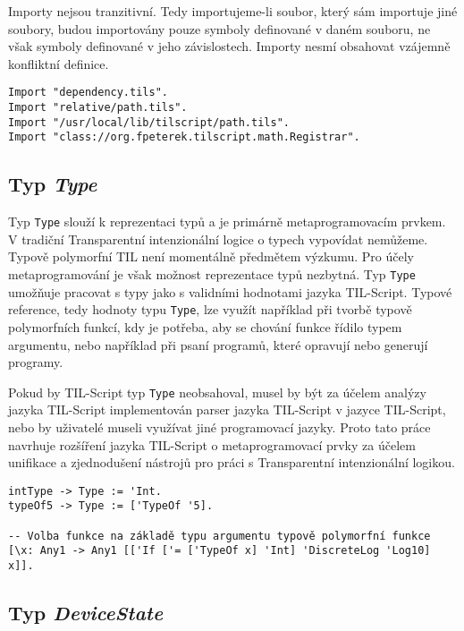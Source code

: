 Importy nejsou tranzitivní. Tedy importujeme-li soubor, který sám importuje jiné soubory, budou
importovány pouze symboly definované v daném souboru, ne však symboly definované v jeho
závislostech. Importy nesmí obsahovat vzájemně konfliktní definice.

\begin{lstlisting}[caption={Příklad využití výrazů Import}]
Import "dependency.tils".
Import "relative/path.tils".
Import "/usr/local/lib/tilscript/path.tils".
Import "class://org.fpeterek.tilscript.math.Registrar".
\end{lstlisting}

\subsection{Typ \textit{Type}}

Typ \lstinline{Type} slouží k reprezentaci typů a je primárně metaprogramovacím prvkem. V tradiční
Transparentní intenzionální logice o typech vypovídat nemůžeme. Typově polymorfní TIL není
momentálně předmětem výzkumu. Pro účely metaprogramování je však možnost reprezentace typů
nezbytná. Typ \lstinline{Type} umožňuje pracovat s typy jako s validními hodnotami jazyka
TIL-Script. Typové reference, tedy hodnoty typu \lstinline{Type}, lze využít například při tvorbě
typově polymorfních funkcí, kdy je potřeba, aby se chování funkce řídilo typem argumentu, nebo
například při psaní programů, které opravují nebo generují programy.

Pokud by TIL-Script typ \lstinline{Type} neobsahoval, musel by být za účelem analýzy jazyka
TIL-Script implementován parser jazyka TIL-Script v jazyce TIL-Script, nebo by uživatelé museli
využívat jiné programovací jazyky. Proto tato práce navrhuje rozšíření jazyka TIL-Script
o metaprogramovací prvky za účelem unifikace a zjednodušení nástrojů pro práci s Transparentní
intenzionální logikou.

\begin{lstlisting}[caption={Příklad využití typových referencí}]
intType -> Type := 'Int.
typeOf5 -> Type := ['TypeOf '5].

-- Volba funkce na základě typu argumentu typově polymorfní funkce
[\x: Any1 -> Any1 [['If ['= ['TypeOf x] 'Int] 'DiscreteLog 'Log10] x]].
\end{lstlisting}

\subsection{Typ \textit{DeviceState}}

